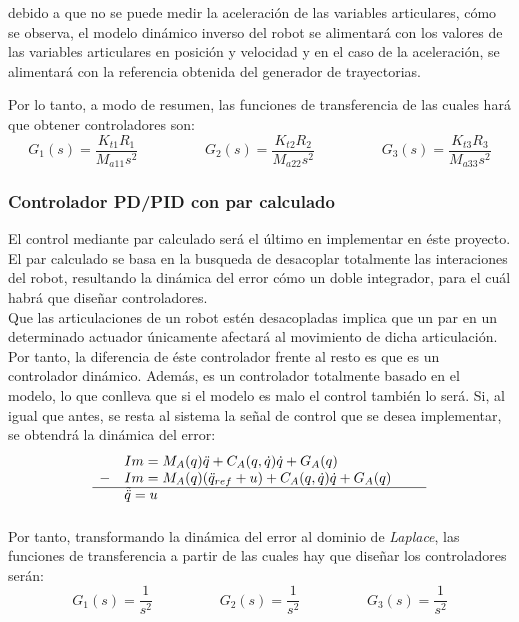 debido a que no se puede medir la aceleración de las variables articulares, cómo se observa, el modelo dinámico inverso del robot se alimentará con los valores de las variables articulares en posición y velocidad y en el caso de la aceleración, se alimentará con la referencia obtenida del generador de trayectorias.

Por lo tanto, a modo de resumen, las funciones de transferencia de las cuales hará que obtener controladores son:
\begin{equation}
	G_{1}(s)=\frac{K_{t1}R_1}{M_{a11}s^{2}} \hspace{2cm} G_{2}(s)=\frac{K_{t2}R_2}{M_{a22}s^{2}} \hspace{2cm} G_{3}(s)=\frac{K_{t3}R_3}{M_{a33}s^{2}}
\end{equation}


	\subsubsection{Controlador PD/PID con par calculado}
	El control mediante par calculado será el último en implementar en éste proyecto. El par calculado se basa en la busqueda de desacoplar totalmente las interaciones del robot, resultando la dinámica del error cómo un doble integrador, para el cuál habrá que diseñar controladores. \\
	Que las articulaciones de un robot estén desacopladas implica que un par en un determinado actuador únicamente afectará al movimiento de dicha articulación.\\
	Por tanto, la diferencia de éste controlador frente al resto es que es un controlador dinámico. Además, es un controlador totalmente basado en el modelo, lo que conlleva que si el modelo es malo el control también lo será.
	Si, al igual que antes, se resta al sistema la señal de control que se desea implementar, se obtendrá la dinámica del error:
	\begin{equation}
		\begin{array}{llll}
		  & Im=M_{A}(q)\ddot{q} + C_{A}(q,\dot{q})\dot{q} + G_{A}(q) \\
		- & Im=M_{A}(q)(\ddot{q}_{ref}+u) + C_{A}(q,\dot{q})\dot{q} + G_{A}(q) \\
		\cline{1-4}
		\vspace{0.2cm}
		  & \tilde{\ddot{q}} = u & &
		\end{array}
	\end{equation}

	Por tanto, transformando la dinámica del error al dominio de \textit{Laplace}, las funciones de transferencia a partir de las cuales hay que diseñar los controladores serán:
	\begin{equation}
		G_{1}(s)=\frac{1}{s^{2}} \hspace{2cm} G_{2}(s)=\frac{1}{s^{2}} \hspace{2cm} G_{3}(s)=\frac{1}{s^{2}}
	\end{equation}

